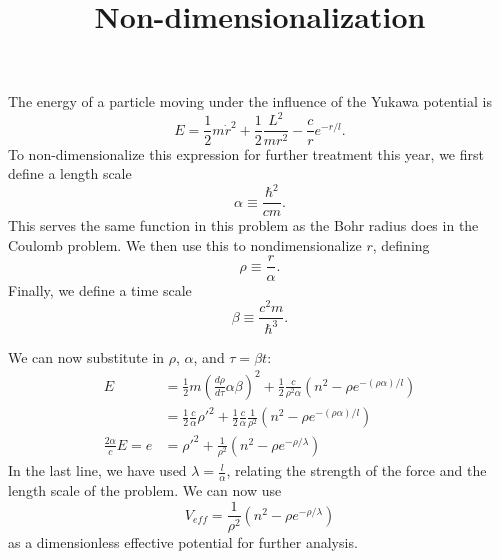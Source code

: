 \documentclass{article}
\title{Non-dimensionalization}
\begin{document}
\maketitle
The energy of a particle moving under the influence of the Yukawa potential is
\begin{equation}
E = \frac{1}{2}m\dot{r}^2+\frac{1}{2}\frac{L^2}{mr^2}-\frac{c}{r}e^{-r/l}\mbox{.}
\label{eq:energy}
\end{equation}
To non-dimensionalize this expression for further treatment this year, we first define a length scale
\begin{equation}
\alpha \equiv \frac{\hbar^2}{cm}\mbox{.}
\label{eq:lengthscale}
\end{equation}
This serves the same function in this problem as the Bohr radius does in the Coulomb problem. We then use this to nondimensionalize $r$, defining
\begin{equation}
\rho \equiv \frac{r}{\alpha}\mbox{.}
\label{eq:rho}
\end{equation}
Finally, we define a time scale
\begin{equation}
\beta \equiv \frac{c^2m}{\hbar^3}\mbox{.}
\label{eq:beta}
\end{equation}

We can now substitute in $\rho$, $\alpha$, and $\tau = \beta t$:
\begin{align}
E &= \frac{1}{2}m\left(\frac{d\rho}{d \tau}\alpha \beta\right)^2+\frac{1}{2}\frac{c}{\rho^2 \alpha}(n^2-\rho e^{-(\rho \alpha)/l}) \\
&= \frac{1}{2}\frac{c}{\alpha}\rho'^2 + \frac{1}{2}\frac{c}{\alpha}\frac{1}{\rho^2}(n^2-\rho e^{-(\rho \alpha)/l}) \\
\frac{2\alpha}{c}E = e &= \rho'^2 +\frac{1}{\rho^2}(n^2 - \rho e^{-\rho/ \lambda})
\end{align}
In the last line, we have used $\lambda = \frac{l}{\alpha}$, relating the strength of the force and the length scale of the problem. We can now use
\begin{equation}
V_{eff}=\frac{1}{\rho^2}(n^2-\rho e^{-\rho/\lambda})
\end{equation}
as a dimensionless effective potential for further analysis.
\end{document}
